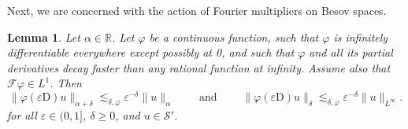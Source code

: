 \documentclass[11pt,a4paper]{article}
\newcommand{\mathD}{\mathrm{D}}
\newcommand{\tmop}[1]{\ensuremath{\operatorname{#1}}}
\newtheorem{lemma}[theorem]{Lemma}
\theoremstyle{remark}
\newcommand{\CF}{\ensuremath{\mathscr{F}}}
\newcommand{\CS}{\ensuremath{\mathscr{S}}}
\begin{document}
Next, we are concerned with the action of Fourier multipliers on Besov spaces.

\begin{lemma}\label{lemma:fourier multiplier smoothing}
   Let $\alpha \in \mathbb{R}$. Let $\varphi$ be a continuous function, such that $\varphi$ is infinitely differentiable everywhere except possibly at 0, and such that $\varphi$ and all its partial derivatives decay faster than any rational function at infinity. Assume also that $\CF \varphi \in L^{1}$. Then
  \[
     \| \varphi ( \varepsilon \mathD ) u \|_{\alpha + \delta} \lesssim_{\delta, \varphi} \varepsilon^{- \delta} \| u \|_{\alpha} \hspace{2em} \tmop{and} \hspace{2em} \| \varphi ( \varepsilon \mathD ) u \|_{\delta}  \lesssim_{\delta , \varphi} \varepsilon^{- \delta} \| u \|_{L^{\infty}} .
  \]
  for all $\varepsilon \in (0,1]$, $\delta \geqslant 0$, and $u \in \CS'$.
\end{lemma}
\end{document}

